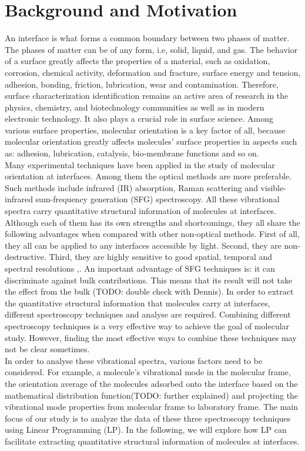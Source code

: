  \label{ch:1}
\section{Background and Motivation}
An interface is what forms a common boundary between two phases of matter. The phases of matter can be of any form, i.e, solid, liquid, and gas. The behavior of a surface greatly affects the properties of a material, such as oxidation, corrosion, chemical activity, deformation and fracture, surface energy and tension, adhesion, bonding, friction, lubrication, wear and contamination. Therefore, surface characterization identification remains an active area of research in the physics, chemistry, and biotechnology communities as well as in modern electronic technology. It also plays a crucial role in surface science. Among various surface properties, molecular orientation is a key factor of all, because molecular orientation greatly affects molecules' surface properties in aspects such as: adhesion, lubrication, catalysis, bio-membrane functions and so on. \cite{PhysRevB.59.12632}\\

Many experimental techniques have been applied in the study of molecular orientation at interfaces. Among them the optical methods are more preferable. Such methods include infrared (IR) absorption, Raman scattering and visible-infrared sum-frequency generation (SFG) spectroscopy. All these vibrational spectra carry quantitative structural information of molecules at interfaces. Although each of them has its own strengths and shortcomings, they all share the following advantages when compared with other non-optical methods. First of all, they all can be applied to any interfaces accessible by light. Second, they are non-destructive. Third, they are highly sensitive to good spatial, temporal and spectral resolutions \cite{01},\cite{02}. An important advantage of SFG techniques is: it can discriminate against bulk contributions. This means that its result will not take the effect from the bulk (TODO: double check with Dennis). In order to extract the quantitative structural information that molecules carry at interfaces, different spectroscopy techniques and analyse are required. Combining different spectroscopy techniques is a very effective way to achieve the goal of molecular study. However, finding the most effective ways to combine these techniques may not be clear sometimes.\\

In order to analyse these vibrational spectra, various factors need to be considered. For example, a molecule's vibrational mode in the molecular frame, the orientation average of the molecules adsorbed onto the interface based on the mathematical distribution function(TODO: further explained) and projecting the vibrational mode properties from molecular frame to laboratory frame. The main focus of our study is to analyze the data of these three spectroscopy techniques using Linear Programming (LP). In the following, we will explore how LP can facilitate extracting quantitative structural information of molecules at interfaces.\\

